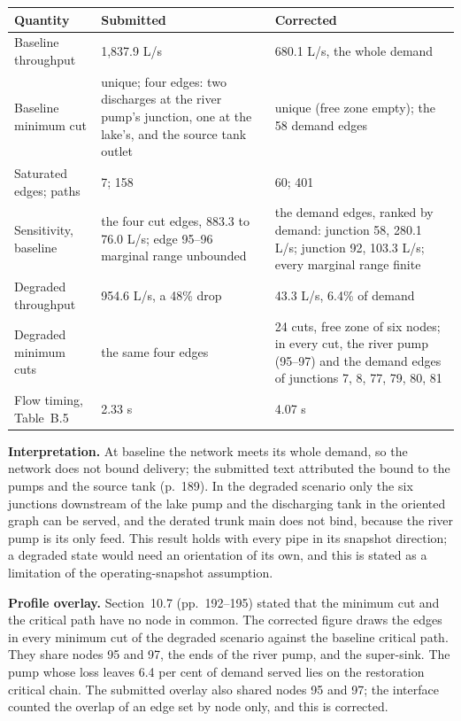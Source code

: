 \documentclass[11pt]{article}
\begin{document}
\begin{tabularx}{\linewidth}{@{}P{3.6cm}LL@{}}
\toprule
Quantity & Submitted & Corrected \\
\midrule
Baseline throughput & 1,837.9 L/s & 680.1 L/s, the whole demand \\
Baseline minimum cut & unique; four edges: two discharges at the river pump's junction, one
at the lake's, and the source tank outlet & unique (free zone empty); the 58 demand edges \\
Saturated edges; paths & 7; 158 & 60; 401 \\
Sensitivity, baseline & the four cut edges, 883.3 to 76.0 L/s; edge 95--96 marginal range
unbounded & the demand edges, ranked by demand: junction 58, 280.1 L/s; junction 92, 103.3
L/s; every marginal range finite \\
Degraded throughput & 954.6 L/s, a 48\% drop & 43.3 L/s, 6.4\% of demand \\
Degraded minimum cuts & the same four edges & 24 cuts, free zone of six nodes; in every cut,
the river pump (95--97) and the demand edges of junctions 7, 8, 77, 79, 80, 81 \\
Flow timing, Table~B.5 & 2.33 s & 4.07 s \\
\bottomrule
\end{tabularx}

\medskip
\textbf{Interpretation.} At baseline the network meets its whole demand, so the network does
not bound delivery; the submitted text attributed the bound to the pumps and the source tank
(p.~189). In the degraded scenario only the six junctions downstream of the lake pump and the
discharging tank in the oriented graph can be served, and the derated trunk main does not
bind, because the river pump is its only feed. This result holds with every pipe in its
snapshot direction; a degraded state would need an orientation of its own, and this is
stated as a limitation of the operating-snapshot assumption.

\textbf{Profile overlay.} Section~10.7 (pp.~192--195) stated that the minimum cut and the
critical path have no node in common. The corrected figure draws the edges in every minimum
cut of the degraded scenario against the baseline critical path. They share nodes 95 and 97,
the ends of the river pump, and the super-sink. The pump whose loss leaves 6.4 per cent of
demand served lies on the restoration critical chain. The submitted overlay also shared nodes
95 and 97; the interface counted the overlap of an edge set by node only, and this is
corrected.
\end{document}
